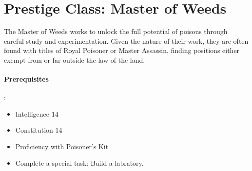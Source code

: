 \documentclass{report}
\newif\ifdm
\newcommand{\dmonly}[1]{\ifdm { \color{red} #1 } \else { } \fi}
\begin{document}
\dmonly{ {\LARGE DM COPY} }



\section*{Prestige Class: Master of Weeds}

The Master of Weeds works to unlock the full potential of poisons through careful study and experimentation.
Given the nature of their work, they are often found with titles of Royal Poisoner or Master Assassin, finding positions either exempt from or far outside the law of the land.


\paragraph*{Prerequisites}:
\begin{itemize}
\item  Intelligence 14
\item  Constitution 14
\item  Proficiency with Poisoner's Kit
\item  Complete a special task: Build a labratory.
\end{itemize}
    
\end{document}
